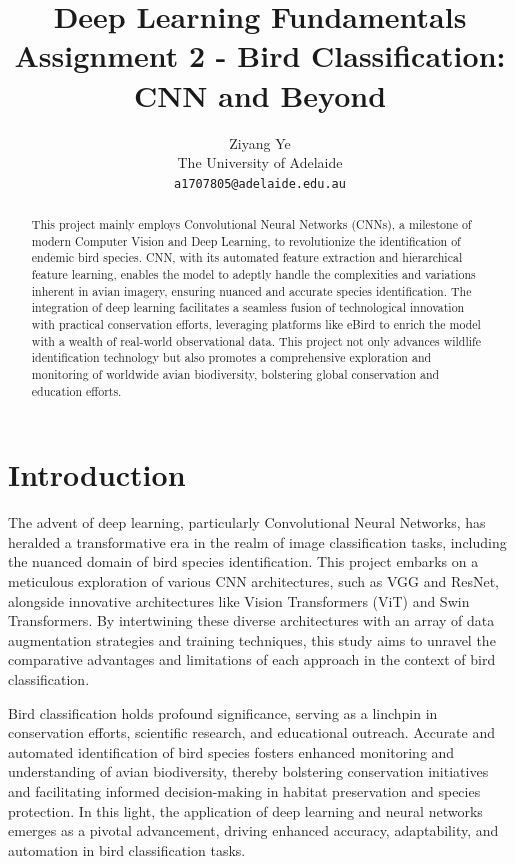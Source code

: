\documentclass[10pt,twocolumn,letterpaper]{article}
\begin{document}
\title{Deep Learning Fundamentals\\
	Assignment 2 - Bird Classification: CNN and Beyond}

\author{Ziyang Ye\\
The University of Adelaide\\
{\tt\small a1707805@adelaide.edu.au}}
\maketitle

\begin{abstract}
	This project mainly employs Convolutional Neural Networks (CNNs), a milestone of modern Computer Vision and Deep Learning, to revolutionize the identification of endemic bird species.
	CNN, with its automated feature extraction and hierarchical feature learning, enables the model to adeptly handle the complexities and variations inherent in avian imagery, ensuring nuanced and accurate species identification. 
	The integration of deep learning facilitates a seamless fusion of technological innovation with practical conservation efforts, leveraging platforms like eBird to enrich the model with a wealth of real-world observational data. 
	This project not only advances wildlife identification technology but also promotes a comprehensive exploration and monitoring of worldwide avian biodiversity, bolstering global conservation and education efforts.
\end{abstract}

\section{Introduction}
\label{sec:intro}
The advent of deep learning, particularly Convolutional Neural Networks, has heralded a transformative era in the realm of image classification tasks, including the nuanced domain of bird species identification. This project embarks on a meticulous exploration of various CNN architectures, such as VGG and ResNet, alongside innovative architectures like Vision Transformers (ViT) and Swin Transformers. By intertwining these diverse architectures with an array of data augmentation strategies and training techniques, this study aims to unravel the comparative advantages and limitations of each approach in the context of bird classification.

Bird classification holds profound significance, serving as a linchpin in conservation efforts, scientific research, and educational outreach. Accurate and automated identification of bird species fosters enhanced monitoring and understanding of avian biodiversity, thereby bolstering conservation initiatives and facilitating informed decision-making in habitat preservation and species protection. In this light, the application of deep learning and neural networks emerges as a pivotal advancement, driving enhanced accuracy, adaptability, and automation in bird classification tasks.
\end{document}
